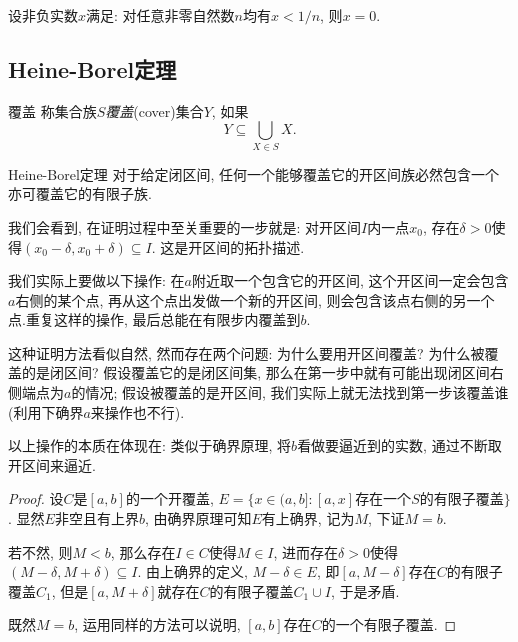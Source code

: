 \begin{corollary}{}
	设非负实数$x$满足: 对任意非零自然数$n$均有$x<1/n$, 则$x=0$.
\end{corollary}

\subsection{Heine-Borel定理}

\begin{definition}{覆盖}
	称集合族$S$\textit{覆盖}(cover)集合$Y$, 如果$$Y \subseteq \bigcup_{X \in S} X.$$
\end{definition}

\begin{theorem}{Heine-Borel定理}
	对于给定闭区间, 任何一个能够覆盖它的开区间族必然包含一个亦可覆盖它的有限子族.
\end{theorem}
\begin{remark}
	我们会看到, 在证明过程中至关重要的一步就是: 对开区间$I$内一点$x_0$, 存在$\delta >0$使得$(x_0-\delta ,x_0+\delta) \subseteq I$. 这是开区间的拓扑描述. 
\end{remark}
\begin{hint}
	我们实际上要做以下操作: 在$a$附近取一个包含它的开区间, 这个开区间一定会包含$a$右侧的某个点, 再从这个点出发做一个新的开区间, 则会包含该点右侧的另一个点.重复这样的操作, 最后总能在有限步内覆盖到$b$.
	
	这种证明方法看似自然, 然而存在两个问题: 为什么要用开区间覆盖? 为什么被覆盖的是闭区间? 假设覆盖它的是闭区间集, 那么在第一步中就有可能出现闭区间右侧端点为$a$的情况; 假设被覆盖的是开区间, 我们实际上就无法找到第一步该覆盖谁(利用下确界$a$来操作也不行).
	
	以上操作的本质在体现在: 类似于确界原理, 将$b$看做要逼近到的实数, 通过不断取开区间来逼近.
\end{hint}
\begin{proof}
	设$C$是$[a,b]$的一个开覆盖, $E=\{ x \in (a, b]: [a, x]\text{存在一个$S$的有限子覆盖} \}$. 显然$E$非空且有上界$b$, 由确界原理可知$E$有上确界, 记为$M$, 下证$M=b$. 
	
	若不然, 则$M<b$, 那么存在$I \in C$使得$M \in I$, 进而存在$\delta >0$使得$(M-\delta ,M+\delta) \subseteq I$. 由上确界的定义, $M-\delta \in E$, 即$[a,M-\delta]$存在$C$的有限子覆盖$C_1$, 但是$[a,M+\delta]$就存在$C$的有限子覆盖$C_1 \cup I$, 于是矛盾. 
	
	既然$M=b$, 运用同样的方法可以说明, $[a,b]$存在$C$的一个有限子覆盖. 
\end{proof}

